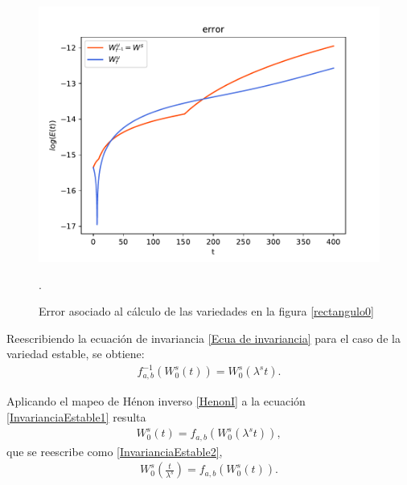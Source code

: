\begin{figure}[H]
\centering
\includegraphics[scale=0.7]{error_rectangulo}
\caption{Error asociado al cálculo de las variedades en la figura \ref{rectangulo0}}.
\label{ErrorRectangulo0}
\end{figure} 

Reescribiendo la ecuación de invariancia \eqref{Ecua de invariancia} para el caso de la variedad estable, se obtiene:
\begin{eqnarray}
f_{a,b}^{-1}(W_{0}^{s}(t))=W_{0}^{s}(\lambda^{s}t).
\label{InvarianciaEstable1}
\end{eqnarray}

Aplicando el mapeo de Hénon inverso \eqref{HenonI} a la ecuación \eqref{InvarianciaEstable1} resulta
\begin{eqnarray}
W_{0}^{s}(t)=f_{a,b}(W_{0}^{s}(\lambda^{s}t)),
\label{InvarianciaEstable2}
\end{eqnarray}
que se reescribe como \eqref{InvarianciaEstable2}, 
\begin{eqnarray}
W_{0}^{s}\left(\frac{t}{\lambda^{s}}\right)=f_{a,b}(W_{0}^{s}(t)).
\label{InvarianciaEstable3}
\end{eqnarray}

